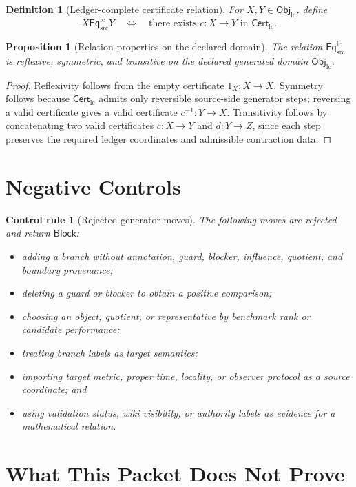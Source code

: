 \documentclass[11pt]{article}
\newcommand{\EqLC}{\mathsf{Eq}_{\mathrm{src}}^{\mathrm{lc}}}
\newcommand{\ObjLC}{\mathsf{Obj}_{\mathrm{lc}}}
\newcommand{\CertLC}{\mathsf{Cert}_{\mathrm{lc}}}
\newcommand{\Block}{\mathsf{Block}}
\newtheorem{definition}{Definition}
\newtheorem{proposition}{Proposition}
\newtheorem{controlrule}{Control rule}
\begin{document}
\begin{definition}[Ledger-complete certificate relation]
For \(X,Y\in\ObjLC\), define
\[
    X \EqLC Y
    \quad\Longleftrightarrow\quad
    \text{there exists } c:X\to Y \text{ in } \CertLC .
\]
\end{definition}

\begin{proposition}[Relation properties on the declared domain]
The relation \(\EqLC\) is reflexive, symmetric, and transitive on the
declared generated domain \(\ObjLC\).
\end{proposition}

\begin{proof}
Reflexivity follows from the empty certificate \(1_X:X\to X\). Symmetry
follows because \(\CertLC\) admits only reversible source-side generator
steps; reversing a valid certificate gives a valid certificate
\(c^{-1}:Y\to X\). Transitivity follows by concatenating two valid
certificates \(c:X\to Y\) and \(d:Y\to Z\), since each step preserves
the required ledger coordinates and admissible contraction data.
\end{proof}

\section{Negative Controls}

\begin{controlrule}[Rejected generator moves]
The following moves are rejected and return \(\Block\):
\begin{itemize}
    \item adding a branch without annotation, guard, blocker, influence,
    quotient, and boundary provenance;
    \item deleting a guard or blocker to obtain a positive comparison;
    \item choosing an object, quotient, or representative by benchmark
    rank or candidate performance;
    \item treating branch labels as target semantics;
    \item importing target metric, proper time, locality, or observer
    protocol as a source coordinate; and
    \item using validation status, wiki visibility, or authority labels
    as evidence for a mathematical relation.
\end{itemize}
\end{controlrule}

\section{What This Packet Does Not Prove}
\end{document}
